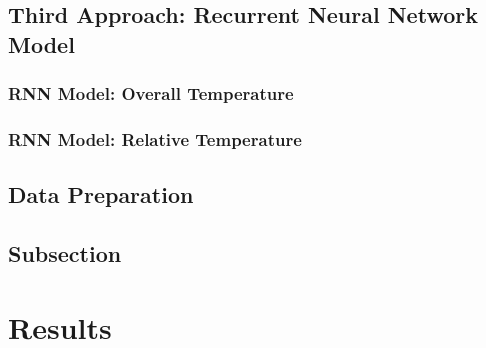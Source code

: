 \documentclass[]{article}
\begin{document}
\subsection{Third Approach: Recurrent Neural Network Model} \label{sec:neural-model}

\subsubsection{RNN Model: Overall Temperature} \label{sec:rnn-model-overall}

\subsubsection{RNN Model: Relative Temperature} \label{sec:rnn-model-relative}

\subsection{Data Preparation} \label{sec:data-prep}



\subsection{Subsection} \label{sec:subsection-name}












\section{Results} \label{sec:results}
\end{document}

